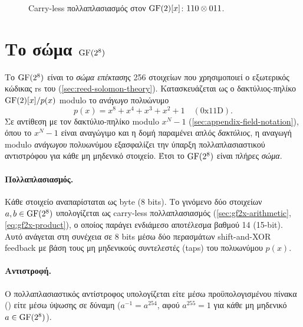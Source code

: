 \begin{figure}[htbp]
  \centering
  
  \captionsetup{list=no}
  \caption[Carry-less πολλαπλασιασμός στον $\GFpoly$: $110 \polymul 011$]{Carry-less πολλαπλασιασμός στον $\GFpoly$: $110 \polymul 011$.}
  \label{fig:gf2x-clmul-example}
\end{figure}

\section{Το σώμα \texorpdfstring{$\mathrm{GF}(2^8)$}{GF(2\textasciicircum 8)}}
\label{sec:appendix-gf256}

Το $\mathrm{GF}(2^8)$ είναι το \emph{σώμα επέκτασης} 256 στοιχείων που χρησιμοποιεί ο εξωτερικός κώδικας \gls{rs} του \HQC (\cref{sec:reed-solomon-theory}). Κατασκευάζεται ως ο δακτύλιος-πηλίκο $\mathrm{GF}(2)[x]/p(x)$ modulo το \emph{ανάγωγο} πολυώνυμο
\begin{equation}
  p(x) = x^8 + x^4 + x^3 + x^2 + 1 \quad (\text{0x11D}).
  \label{eq:gf256-modulus}
\end{equation}
Σε αντίθεση με τον δακτύλιο-πηλίκο modulo $x^N-1$ (\cref{sec:appendix-field-notation}), όπου το $x^N-1$ είναι αναγώγιμο και η δομή παραμένει απλός \emph{δακτύλιος}, η αναγωγή modulo \emph{ανάγωγου} πολυωνύμου εξασφαλίζει την ύπαρξη πολλαπλασιαστικού αντιστρόφου για κάθε μη μηδενικό στοιχείο. Έτσι το $\mathrm{GF}(2^8)$ είναι πλήρες \emph{σώμα}.

\paragraph{Πολλαπλασιασμός.}
Κάθε στοιχείο αναπαρίσταται ως byte (8 bits). Το γινόμενο δύο στοιχείων $a, b \in \mathrm{GF}(2^8)$ υπολογίζεται ως carry-less πολλαπλασιασμός (\cref{sec:gf2x-arithmetic}, \cref{eq:gf2x-product}), ο οποίος παράγει ενδιάμεσο αποτέλεσμα βαθμού 14 (15-bit). Αυτό ανάγεται στη συνέχεια σε 8 bits μέσω δύο περασμάτων shift-and-XOR feedback με βάση τους μη μηδενικούς συντελεστές (taps) του πολυωνύμου $p(x)$.

\paragraph{Αντιστροφή.}
Ο πολλαπλασιαστικός αντίστροφος υπολογίζεται είτε μέσω προϋπολογισμένου πίνακα () είτε μέσω ύψωσης σε δύναμη ($a^{-1} = a^{254}$, αφού $a^{255} = 1$ για κάθε μη μηδενικό $a \in \mathrm{GF}(2^8)$).
